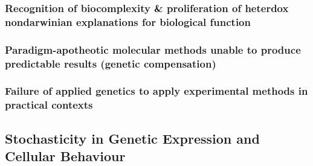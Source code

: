 \subsubsection{Recognition of biocomplexity \& proliferation of heterdox nondarwinian explanations for biological function}
\subsubsection{Paradigm-apotheotic molecular methods unable to produce predictable results (genetic compensation)}
\subsubsection{Failure of applied genetics to apply experimental methods in practical contexts}

\subsection{Stochasticity in Genetic Expression and Cellular Behaviour}

